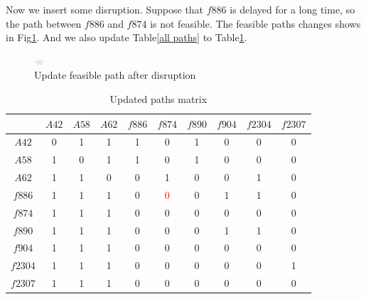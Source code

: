 \documentclass[senior]{IPSstyle}
\begin{document}
Now we insert some disruption.
Suppose that \(f886\) is delayed for a long time, so the path between \(f886\) and \(f874\) is not feasible. The feasible paths changes shows in Fig\ref{fig:disruption}. 
And we also update Table\ref{all paths} to Table\ref{table:updated paths}. 
\begin{figure}[h]
    \centering
    \includegraphics[width=15]{MasterThesis-master/updated paths.png}
    \caption{Update feasible path after disruption}
    \label{fig:disruption}
\end{figure}

\begin{table}[h]
\renewcommand{\arraystretch}{1}
\caption{Updated paths matrix}
\label{table:updated paths}
\begin{center}
\begin{tabular}{|c|c|c|c|c|c|c|c|c|c|}
\hline
\multicolumn{1}{|c|}{}
&\multicolumn{1}{|c|}{\(A42\)}
&\multicolumn{1}{c|}{\(A58\)}
&\multicolumn{1}{c|}{\(A62\)}
&\multicolumn{1}{|c|}{\(f886\)}
&\multicolumn{1}{c|}{\(f874\)}
&\multicolumn{1}{c|}{\(f890\)}
&\multicolumn{1}{c|}{\(f904\)}
&\multicolumn{1}{c|}{\(f2304\)}
&\multicolumn{1}{c|}{\(f2307\)}
\\  \hline
\(A42\) & 0 & 1 & 1 & 1 & 0 & 1 & 0 & 0 & 0
\\	\hline
\(A58\) & 1 & 0 & 1 & 1 & 0 & 1 & 0 & 0 & 0
\\	\hline
\(A62\) & 1 & 1 & 0 & 0 & 1 & 0 & 0 & 1 & 0
\\  \hline
\(f886\) & 1 & 1 & 1 & 0 & \textcolor{red}{0} & 0 & 1 & 1 & 0
\\	\hline
\(f874\) & 1 & 1 & 1 & 0 & 0 & 0 & 0 & 0 & 0
\\	\hline
\(f890\) & 1 & 1 & 1 & 0 & 0 & 0 & 1 & 1 & 0
\\  \hline
\(f904\) & 1 & 1 & 1 & 0 & 0 & 0 & 0 & 0 & 0
\\  \hline
\(f2304\) & 1 & 1 & 1 & 0 & 0 & 0 & 0 & 0 & 1
\\  \hline
\(f2307\) & 1 & 1 & 1 & 0 & 0 & 0 & 0 & 0 & 0
\\  \hline
\end{tabular}
\end{center}
\end{table}
\end{document}
